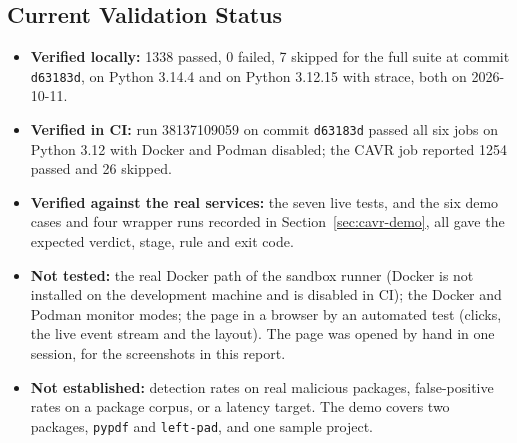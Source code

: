 \subsection{Current Validation Status}
\begin{itemize}
    \item \textbf{Verified locally:} 1338 passed, 0 failed, 7 skipped for the full suite at commit \texttt{d63183d}, on Python 3.14.4 and on Python 3.12.15 with strace, both on 2026-10-11.
    \item \textbf{Verified in CI:} run 38137109059 on commit \texttt{d63183d} passed all six jobs on Python 3.12 with Docker and Podman disabled; the CAVR job reported 1254 passed and 26 skipped.
    \item \textbf{Verified against the real services:} the seven live tests, and the six demo cases and four wrapper runs recorded in Section~\ref{sec:cavr-demo}, all gave the expected verdict, stage, rule and exit code.
    \item \textbf{Not tested:} the real Docker path of the sandbox runner (Docker is not installed on the development machine and is disabled in CI); the Docker and Podman monitor modes; the page in a browser by an automated test (clicks, the live event stream and the layout). The page was opened by hand in one session, for the screenshots in this report.
    \item \textbf{Not established:} detection rates on real malicious packages, false-positive rates on a package corpus, or a latency target. The demo covers two packages, \texttt{pypdf} and \texttt{left-pad}, and one sample project.
\end{itemize}

